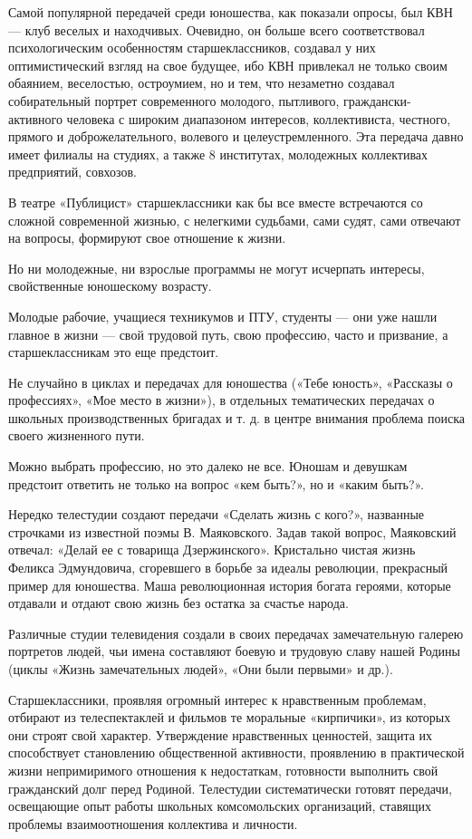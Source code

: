 \documentclass[12pt, a4paper, openany]{book}
\begin{document}
Самой популярной передачей среди юношества, как показали опросы, был КВН — клуб веселых и находчивых. Очевидно, он больше всего соответствовал психологическим особенностям старшеклассников, создавал у них оптимистический взгляд на свое будущее, ибо КВН привлекал не только своим обаянием, веселостью, остроумием, но и тем, что незаметно создавал собирательный портрет современного молодого, пытливого, граждански-активного человека с широким диапазоном интересов, коллективиста, честного, прямого и доброжелательного, волевого и целеустремленного. Эта передача давно имеет филиалы на студиях, а также 8 институтах, молодежных коллективах предприятий, совхозов. 

В театре «Публицист» старшеклассники как бы все вместе встречаются со сложной современной жизнью, с нелегкими судьбами, сами судят, сами отвечают на вопросы, формируют свое отношение к жизни. 

Но ни молодежные, ни взрослые программы не могут исчерпать интересы, свойственные юношескому возрасту. 

Молодые рабочие, учащиеся техникумов и ПТУ, студенты — они уже нашли главное в жизни — свой трудовой путь, свою профессию, часто и призвание, а старшеклассникам это еще предстоит. 

Не случайно в циклах и передачах для юношества («Тебе юность», «Рассказы о профессиях», «Мое место в жизни»), в отдельных тематических передачах о школьных производственных бригадах и т. д. в центре внимания проблема поиска своего жизненного пути. 

Можно выбрать профессию, но это далеко не все. Юношам и девушкам предстоит ответить не только на вопрос «кем быть?», но и «каким быть?». 

Нередко телестудии создают передачи «Сделать жизнь с кого?», названные строчками из известной поэмы В. Маяковского. Задав такой вопрос, Маяковский отвечал: «Делай ее с товарища Дзержинского». Кристально чистая жизнь Феликса Эдмундовича, сгоревшего в борьбе за идеалы революции, прекрасный пример для юношества. Маша революционная история богата героями, которые отдавали и отдают свою жизнь без остатка за счастье народа. 

Различные студии телевидения создали в своих передачах замечательную галерею портретов людей, чьи имена составляют боевую и трудовую славу нашей Родины (циклы «Жизнь замечательных людей», «Они были первыми» и др.). 

Старшеклассники, проявляя огромный интерес к нравственным проблемам, отбирают из телеспектаклей и фильмов те моральные «кирпичики», из которых они строят свой характер. Утверждение нравственных ценностей, защита их способствует становлению общественной активности, проявлению в практической жизни непримиримого отношения к недостаткам, готовности выполнить свой гражданский долг перед Родиной. Телестудии систематически готовят передачи, освещающие опыт работы школьных комсомольских организаций, ставящих проблемы взаимоотношения коллектива и личности. 
\end{document}
